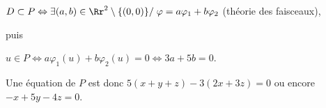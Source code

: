 {\begin{enumerate}
{\begin{center}
$D\subset P\Leftrightarrow\exists(a,b)\in\Rr^2\setminus\{(0,0)\}/\;\varphi= a\varphi_1+b\varphi_2$ (théorie des faisceaux),
\end{center}

puis

\begin{center}
$u\in P\Leftrightarrow a\varphi_1(u)+b\varphi_2(u) = 0\Leftrightarrow 3a + 5b = 0$.
\end{center}

Une équation de $P$ est donc $5(x+y+z)-3(2x+3z) = 0$ ou encore $-x + 5y -4z = 0$.}
\end{enumerate}
}
